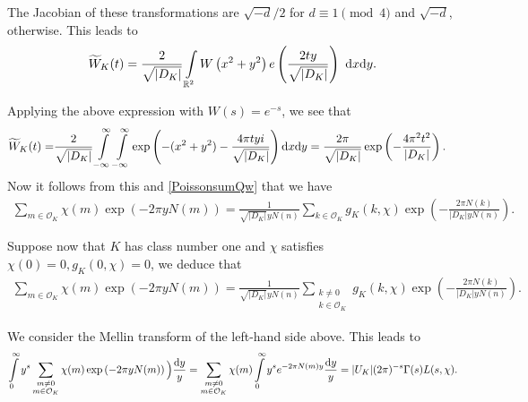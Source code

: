 \documentclass[twoside,leqno,10pt, A4]{amsart}
\begin{document}
The Jacobian of these transformations are $\sqrt{-d}/2$ for $d \equiv 1 \pmod 4$ and $\sqrt{-d}$, otherwise. This leads to
\begin{align*}
     \widetilde{W}_{K}(t)  =
\displaystyle{   \frac {2}{\sqrt{|D_K|}}\int\limits_{\ensuremath{\mathbb R}^2}W \left( x^2+y^2 \right) e \left( \frac {2ty}{\sqrt{|D_K|}} \right) \ \mathrm{d}x \mathrm{d}y
} .
\end{align*}

 Applying the above expression with $W(s)=e^{-s}$, we see that
\begin{align*}
   \widetilde{W}_K(t) =& \frac {2}{\sqrt{|D_K|}}\int\limits^{\infty}_{-\infty}\int\limits^{\infty}_{-\infty} \exp \left( -(x^2+y^2)-\frac {4\pi ty i
}{\sqrt{|D_K|}} \right) \mathrm{d} x \mathrm{d} y =\frac {2\pi}{\sqrt{|D_K|}} \exp \left( -\frac {4\pi^2t^2}{|D_K|} \right).
\end{align*}
Now it follows from this and \eqref{PoissonsumQw} that we have
\begin{align*}
   \sum_{m \in \mathcal{O}_K}\chi(m)\exp \left(-2\pi y N(m)\right)=\frac {1}{\sqrt{|D_K|} y N(n)}\sum_{k \in
   \mathcal{O}_K}g_K(k,\chi)\exp \left(-\frac {2\pi N(k)}{|D_K| y N(n)}\right).
\end{align*}

 Suppose now that $K$ has class number one and $\chi$ satisfies $\chi(0)=0, g_K(0,\chi)=0$, we deduce
that
\begin{align}
\label{PoissonsumWet1}
   \sum_{m \in \mathcal{O}_K}\chi(m)\exp \left(-2\pi y N(m)\right)=\frac {1}{\sqrt{|D_K|} y N(n)}\sum_{\substack{ k \neq 0 \\ k \in
   \mathcal{O}_K}}g_K(k,\chi)\exp \left(-\frac {2\pi N(k)}{|D_K| y N(n)}\right).
\end{align}

   We consider the Mellin transform of the left-hand side above.  This leads to
\begin{equation}
\label{keyleft}
	\int\limits_{0}^{\infty}y^{s}\sum_{\substack{m \neq 0 \\ m \in \mathcal{O}_K}}\chi(m)\exp \left(-2\pi y N(m)\right)\Big )\frac{\mathrm{d}
y}{y}=\sum_{\substack{m \neq 0 \\ m \in \mathcal{O}_K}}\chi(m)\int\limits_{0}^{\infty}y^{s}e^{-2\pi N(m)y}\frac{\mathrm{d}
y}{y}=|U_K|(2\pi)^{-s}\Gamma(s) L(s,\chi).
\end{equation}
\end{document}
